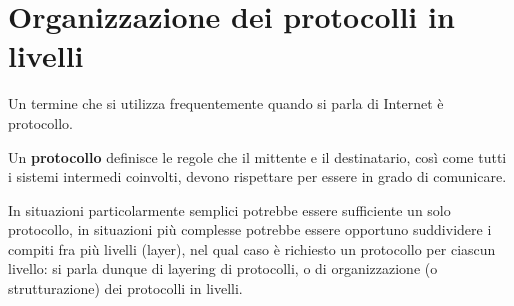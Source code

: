 \chapter{Organizzazione dei protocolli in livelli}

Un termine che si utilizza frequentemente quando si parla di Internet è protocollo.
\begin{redbar}
    Un \textbf{protocollo} definisce le regole che il mittente e il destinatario, così come tutti i sistemi intermedi coinvolti, devono rispettare per essere in grado di comunicare.
\end{redbar}

In situazioni particolarmente semplici potrebbe essere sufficiente un solo protocollo, in situazioni più complesse potrebbe essere opportuno suddividere i compiti fra più livelli (layer), nel qual caso è richiesto un protocollo per ciascun livello: si parla dunque di layering di protocolli, o di organizzazione (o strutturazione) dei protocolli in livelli.

